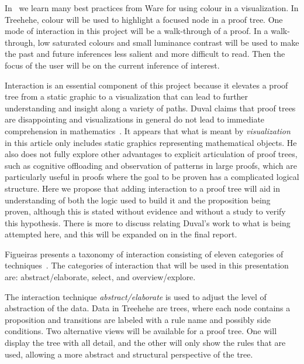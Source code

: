 \documentclass[12pt]{article}
\newcommand{\projectname}{Treehehe}
\begin{document}

In~\cite{infovis-ware} we learn many best practices from Ware for using colour in a visualization. In \projectname{}, colour will be used to highlight a focused node in a proof tree. One mode of interaction in this project will be a walk-through of a proof. In a walk-through, low saturated colours and small luminance contrast will be used to make the past and future inferences less salient and more difficult to read. Then the focus of the user will be on the current inference of interest.


Interaction is an essential component of this project because it elevates a proof tree from a static graphic to a visualization that can lead to further understanding and insight along a variety of paths. Duval claims that proof trees are disappointing and visualizations in general do not lead to immediate comprehension in mathematics~\cite{repvisvis-duval}. It appears that what is meant by \textit{visualization} in this article only includes static graphics representing mathematical objects. He also does not fully explore other advantages to explicit articulation of proof trees, such as cognitive offloading and observation of patterns in large proofs, which are particularly useful in proofs where the goal to be proven has a complicated logical structure. Here we propose that adding interaction to a proof tree will aid in understanding of both the logic used to build it and the proposition being proven, although this is stated without evidence and without a study to verify this hypothesis. There is more to discuss relating Duval's work to what is being attempted here, and this will be expanded on in the final report.

Figueiras presents a taxonomy of interaction consisting of eleven categories of techniques~\cite{interaction-figueiras}. The categories of interaction that will be used in this presentation are: abstract/elaborate, select, and overview/explore. %

The interaction technique \textit{abstract/elaborate} is used to adjust the level of abstraction of the data. Data in \projectname{} are trees, where each node contains a proposition and transitions are labeled with a rule name and possibly side conditions. Two alternative views will be available for a proof tree. One will display the tree with all detail, and the other will only show the rules that are used, allowing a more abstract and structural perspective of the tree.
\end{document}
